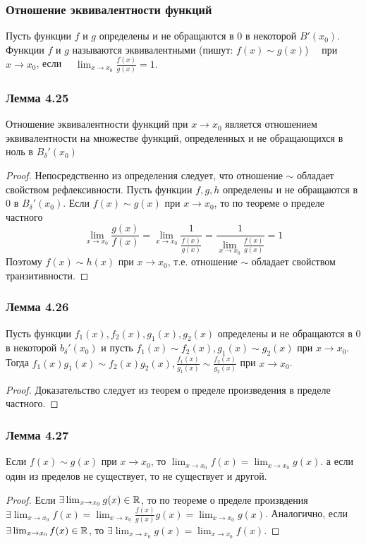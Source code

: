 \documentclass[12pt, a4paper]{article}
\begin{document}
    \subsubsection{Отношение эквивалентности функций}
     Пусть функции $f$ и $g$ определены и не обращаются в 0 в некоторой $B'(x_0).$ Функции $f$ и $g$ называются эквивалентными (пишут: $f(x) \sim g(x)$) \ \ при $x \to x_0$, если \ \ $\lim_{x \to x_0} \frac{f(x)}{g(x)} = 1.$
    \subsubsection{Лемма 4.25}
    Отношение эквивалентности функций при $x \to x_0$ является отношением эквивалентности на множестве функций, определенных и не обращающихся в ноль в $B_{\delta}'(x_0)$
    \begin{proof}
    Непосредственно из определения следует, что отношение $\sim$ обладает свойством рефлексивности. Пусть функции $f, g, h$ определены и не обращаются в $0$ в $B_{\delta}'(x_0)$. Если $f(x) \sim g(x)$ при $x \to x_0$, то по теореме о пределе частного
    \begin{equation*}
        \lim_{x \to x_0} \frac{g(x)}{f(x)} = \lim_{x \to x_0} \frac{1}{\frac{f(x)}{g(x)}} = \frac{1}{\displaystyle \lim_{x \to x_0} \frac{f(x)}{g(x)}} = 1
    \end{equation*}
    Поэтому $f(x) \sim h(x)$ при $x \to x_0$, т.е. отношение $\sim$ обладает свойством транзитивности.
    \end{proof}
    \subsubsection{Лемма 4.26}
    Пусть функции $f_1(x), f_2(x), g_1(x), g_2(x)$ определены и не обращаются в 0 в некоторой $b_{\delta}'(x_0)$ и пусть $f_1(x) \sim f_2(x), g_1(x) \sim g_2(x)$ при $x \to x_0$. Тогда $f_1(x) g_1(x) \sim f_2(x) g_2(x), \frac{f_1(x)}{g_1(x)} \sim \frac{f_2(x)}{g_2(x)}$ при $x \to x_0$.
    \begin{proof}
    Доказательство следует из теорем о пределе произведения в пределе частного.
    \end{proof}
    \subsubsection{Лемма 4.27}
    Если $f(x) \sim g(x)$ при $x \to x_0$, то $\lim_{x \to x_0} f(x) = \lim_{x \to x_0} g(x)$. а если один из пределов не существует, то не существует и другой.
    \begin{proof}
    Если $\exists \lim_{x \to x_0} g(x) \in \mathbb{R}$, то по теореме о пределе произвдения $\exists \lim_{x \to x_0} f(x) = \lim_{x \to x_0} \frac{f(x)}{g(x)} g(x) = \lim_{x \to x_0} g(x)$. Аналогично, если $\exists \lim_{x \to x_0} f(x) \in \mathbb{R}$, то $\exists \lim_{x \to x_0} g(x) = \lim_{x \to x_0} f(x)$.
    \end{proof}
\end{document}
